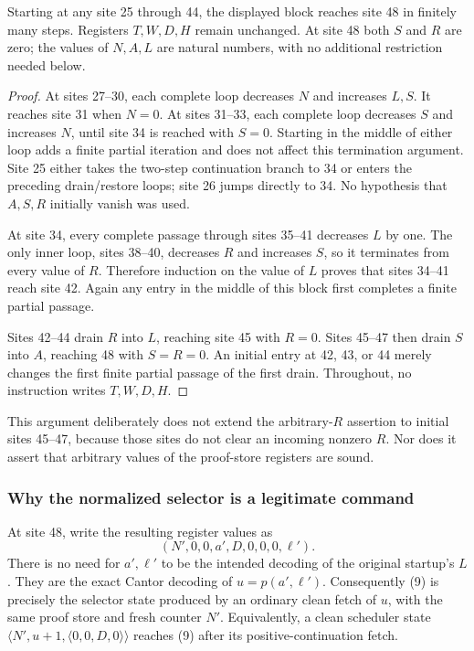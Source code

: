 \begin{lemma}
Starting at any site 25 through 44, the displayed block reaches site 48
in finitely many steps. Registers $T,W,D,H$ remain unchanged. At site 48
both $S$ and $R$ are zero; the values of $N,A,L$ are natural numbers, with
no additional restriction needed below.
\end{lemma}
\begin{proof}
At sites 27--30, each complete loop decreases $N$ and increases $L,S$.
It reaches site 31 when $N=0$. At sites 31--33, each complete loop
decreases $S$ and increases $N$, until site 34 is reached with $S=0$.
Starting in the middle of either loop adds a finite partial iteration
and does not affect this termination argument. Site 25 either takes the
two-step continuation branch to 34 or enters the preceding drain/restore
loops; site 26 jumps directly to 34. No hypothesis that $A,S,R$ initially
vanish was used.

At site 34, every complete passage through sites 35--41 decreases $L$
by one. The only inner loop, sites 38--40, decreases $R$ and increases
$S$, so it terminates from every value of $R$. Therefore induction on
the value of $L$ proves that sites 34--41 reach site 42. Again any entry
in the middle of this block first completes a finite partial passage.

Sites 42--44 drain $R$ into $L$, reaching site 45 with $R=0$.
Sites 45--47 then drain $S$ into $A$, reaching 48 with $S=R=0$.
An initial entry at 42, 43, or 44 merely changes the first finite partial
passage of the first drain. Throughout, no instruction writes $T,W,D,H$.
\end{proof}

This argument deliberately does not extend the arbitrary-$R$ assertion
to initial sites 45--47, because those sites do not clear an incoming
nonzero $R$. Nor does it assert that arbitrary values of the proof-store
registers are sound.

\subsubsection{Why the normalized selector is a legitimate command}

At site 48, write the resulting register values as
\[
               (N',0,0,a',D,0,0,0,\ell').
\tag{9}
\]
There is no need for $a',\ell'$ to be the intended decoding of the
original startup's $L$. They are the exact Cantor decoding of
$u=p(a',\ell')$. Consequently (9) is precisely the selector state
produced by an ordinary clean fetch of $u$, with the same proof store
and fresh counter $N'$. Equivalently, a clean scheduler state
$\langle N',u+1,\langle0,0,D,0\rangle\rangle$ reaches (9) after its
positive-continuation fetch.

